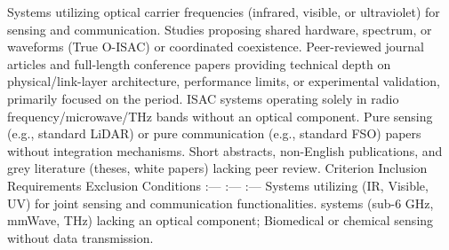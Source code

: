 {}\markdownRendererInterblockSeparator
{}\markdownRendererUlBeginTight
\markdownRendererUlItem {} Systems utilizing optical carrier frequencies (infrared, visible, or ultraviolet) for  sensing and communication.\markdownRendererUlItemEnd 
\markdownRendererUlItem {} Studies proposing shared hardware, spectrum, or waveforms (True O-ISAC) or coordinated coexistence.\markdownRendererUlItemEnd 
\markdownRendererUlItem {} Peer-reviewed journal articles and full-length conference papers providing technical depth on physical/link-layer architecture, performance limits, or experimental validation, primarily focused on the  period.\markdownRendererUlItemEnd 
\markdownRendererUlEndTight \markdownRendererInterblockSeparator
{}\markdownRendererInterblockSeparator
{}\markdownRendererUlBeginTight
\markdownRendererUlItem {} ISAC systems operating solely in radio frequency/microwave/THz bands without an optical component.\markdownRendererUlItemEnd 
\markdownRendererUlItem {} Pure sensing (e.g., standard LiDAR) or pure communication (e.g., standard FSO) papers without integration mechanisms.\markdownRendererUlItemEnd 
\markdownRendererUlItem {} Short abstracts, non-English publications, and grey literature (theses, white papers) lacking peer review.\markdownRendererUlItemEnd 
\markdownRendererUlEndTight \markdownRendererInterblockSeparator
{}\markdownRendererSectionBegin
{}\markdownRendererInterblockSeparator
{}\markdownRendererPipe{} Criterion \markdownRendererPipe{} Inclusion Requirements \markdownRendererPipe{} Exclusion Conditions \markdownRendererPipe{}\markdownRendererSoftLineBreak
{}\markdownRendererPipe{} :--- \markdownRendererPipe{} :--- \markdownRendererPipe{} :--- \markdownRendererPipe{}\markdownRendererSoftLineBreak
{}\markdownRendererPipe{}  \markdownRendererPipe{} Systems utilizing  (IR, Visible, UV) for joint sensing and communication functionalities. \markdownRendererPipe{}  systems (sub-6 GHz, mmWave, THz) lacking an optical component; Biomedical or chemical sensing without data transmission. \markdownRendererPipe{}\markdownRendererSoftLineBreak
